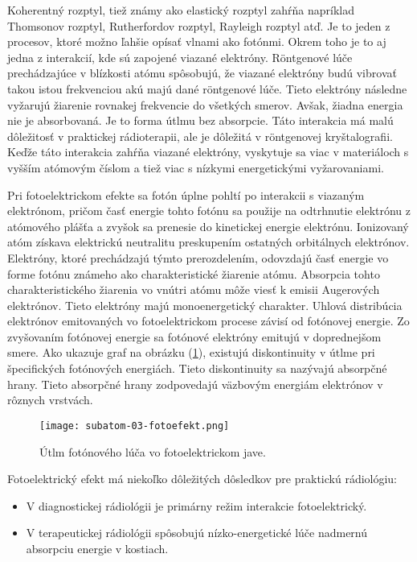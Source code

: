 \documentclass[../../main.tex]{subfiles}
\begin{document}
Koherentný rozptyl, tiež známy ako elastický rozptyl zahŕňa napríklad Thomsonov rozptyl, Rutherfordov rozptyl, Rayleigh rozptyl atď. Je to jeden z procesov, ktoré možno ľahšie opísať vlnami ako fotónmi. Okrem toho je to aj jedna z interakcií, kde sú zapojené viazané elektróny. Röntgenové lúče prechádzajúce v blízkosti atómu spôsobujú, že viazané elektróny budú vibrovať takou istou frekvenciou akú majú dané röntgenové lúče. Tieto elektróny následne vyžarujú žiarenie rovnakej frekvencie do všetkých smerov. Avšak, žiadna energia nie je absorbovaná. Je to forma útlmu bez absorpcie. Táto interakcia má malú dôležitosť v praktickej rádioterapii, ale je dôležitá v röntgenovej kryštalografii. Keďže táto interakcia zahŕňa viazané elektróny, vyskytuje sa viac v materiáloch s vyšším atómovým číslom a tiež viac s nízkymi energetickými vyžarovaniami.

Pri fotoelektrickom efekte sa fotón úplne pohltí po interakcii s viazaným elektrónom, pričom časť energie tohto fotónu sa použije na odtrhnutie elektrónu z atómového plášťa a zvyšok sa prenesie do kinetickej energie elektrónu. Ionizovaný atóm získava elektrickú neutralitu preskupením ostatných orbitálnych elektrónov. Elektróny, ktoré prechádzajú týmto prerozdelením, odovzdajú časť energie vo forme fotónu známeho ako charakteristické žiarenie atómu. Absorpcia tohto charakteristického žiarenia vo vnútri atómu môže viesť k emisii Augerových elektrónov. Tieto elektróny majú monoenergetický charakter. Uhlová distribúcia elektrónov emitovaných vo fotoelektrickom procese závisí od fotónovej energie. Zo zvyšovaním fotónovej energie sa fotónové elektróny emitujú v doprednejšom smere. Ako ukazuje graf na obrázku (\ref{sf3:fig:photo}), existujú diskontinuity v útlme pri špecifických fotónových energiách. Tieto diskontinuity sa nazývajú absorpčné hrany. Tieto absorpčné hrany zodpovedajú väzbovým energiám elektrónov v rôznych vrstvách.

\begin{figure}[!h]
\texttt{[image: subatom-03-fotoefekt.png]}
\centering
\caption{Útlm fotónového lúča vo fotoelektrickom jave.}
\label{sf3:fig:photo}
\end{figure}

Fotoelektrický efekt má niekoľko dôležitých dôsledkov pre praktickú rádiológiu:
\begin{itemize}
\item V diagnostickej rádiológii je primárny režim interakcie fotoelektrický.
\item V terapeutickej rádiológii spôsobujú nízko-energetické lúče nadmernú absorpciu energie v kostiach.
\end{itemize}
\end{document}
